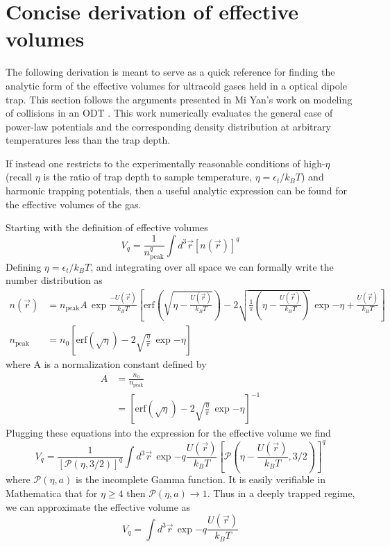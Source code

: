 \chapter{Concise derivation of effective volumes}
\label{app:effective_volumes}

The following derivation is meant to serve as a quick reference for finding the analytic form of the effective volumes for ultracold gases held in a optical dipole trap.
This section follows the arguments presented in Mi Yan's work on modeling of collisions in an ODT \cite{Yan2011}.
This work numerically evaluates the general case of power-law potentials and the corresponding density distribution at arbitrary temperatures less than the trap depth.

If instead one restricts to the experimentally reasonable conditions of high-$\eta$ (recall $\eta$ is the ratio of trap depth to sample temperature, $\eta=\epsilon_t/k_B T$) and harmonic trapping potentials, then a useful analytic expression can be found for the effective volumes of the gas.

Starting with the definition of effective volumes
\begin{equation}
	V_q = \frac{1}{n_\text{peak}^q} \int d^3\vec{r} [n(\vec{r})]^q
\end{equation}
Defining $\eta = \epsilon_t / k_B T$, and integrating over all space we can formally write the number distribution as
\begin{align}
	n(\vec{r}) &= n_\text{peak} A \,\exp{\frac{-U(\vec{r})}{k_B T}} \left[ \text{erf}\left( \sqrt{\eta - \frac{U(\vec{r})}{k_B T}} \right) - 2 \sqrt{\frac{1}{\pi}\left( \eta - \frac{U(\vec{r})}{k_B T} \right)}\,\exp{-\eta +  \frac{U(\vec{r})}{k_B T}} \right] \\
	n_\text{peak} &= n_0 \left[ \text{erf}\left( \sqrt{\eta} \right) - 2 \sqrt{\frac{\eta}{\pi}}\,\exp{-\eta} \right]
\end{align}
where A is a normalization constant defined by
\begin{align*}
	A &= \frac{n_0}{n_\text{peak}} \\
   	  &= \left[ \text{erf}\left( \sqrt{\eta} \right) - 2 \sqrt{\frac{\eta}{\pi}}\,\exp{-\eta} \right]^{-1}
\end{align*}
Plugging these equations into the expression for the effective volume we find
\begin{equation}
	V_q = \frac{1}{[\mathcal{P}(\eta,3/2)]^q} \int d^3\vec{r}\, \exp{-q \frac{U(\vec{r})}{k_B T}} \left[ \mathcal{P}(\eta - \frac{U(\vec{r})}{k_B T}, 3/2) \right]^q
\end{equation}
where $\mathcal{P}(\eta, a)$ is the incomplete Gamma function.
It is easily verifiable in Mathematica that for $\eta \geq 4$ then $\mathcal{P}(\eta,a)\rightarrow1$.
Thus in a deeply trapped regime, we can approximate the effective volume as
\begin{equation}
	V_q = \int d^3\vec{r} \,\exp{-q\frac{U(\vec{r})}{k_B T}}
\end{equation}

